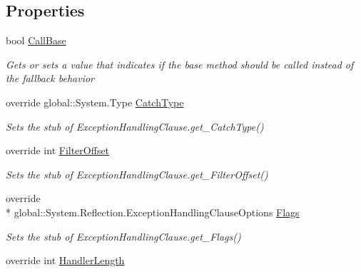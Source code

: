 \subsection*{Properties}
\begin{DoxyCompactItemize}
\item 
bool \hyperlink{class_system_1_1_reflection_1_1_fakes_1_1_stub_exception_handling_clause_aa2afe3d21b5d4d50de0eebc0cdbd67e9}{Call\-Base}
\begin{DoxyCompactList}\small\item\em Gets or sets a value that indicates if the base method should be called instead of the fallback behavior\end{DoxyCompactList}\item 
override global\-::\-System.\-Type \hyperlink{class_system_1_1_reflection_1_1_fakes_1_1_stub_exception_handling_clause_a96f6d50769adba9eace7d364c011a29b}{Catch\-Type}
\begin{DoxyCompactList}\small\item\em Sets the stub of Exception\-Handling\-Clause.\-get\-\_\-\-Catch\-Type()\end{DoxyCompactList}\item 
override int \hyperlink{class_system_1_1_reflection_1_1_fakes_1_1_stub_exception_handling_clause_ade916bd74c66d00d567d6ef13d4bbfe5}{Filter\-Offset}
\begin{DoxyCompactList}\small\item\em Sets the stub of Exception\-Handling\-Clause.\-get\-\_\-\-Filter\-Offset()\end{DoxyCompactList}\item 
override \\*
global\-::\-System.\-Reflection.\-Exception\-Handling\-Clause\-Options \hyperlink{class_system_1_1_reflection_1_1_fakes_1_1_stub_exception_handling_clause_ac0ed2b3c711e759e4181ed6294bc591f}{Flags}
\begin{DoxyCompactList}\small\item\em Sets the stub of Exception\-Handling\-Clause.\-get\-\_\-\-Flags()\end{DoxyCompactList}\item 
override int \hyperlink{class_system_1_1_reflection_1_1_fakes_1_1_stub_exception_handling_clause_a31b4a17d17adeed79b2cbe37eebd0ff7}{Handler\-Length}

\end{DoxyCompactItemize}
